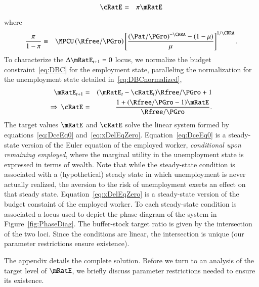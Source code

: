 \documentclass[titlepage,abstract]{\econtex}\newcommand{\texname}{ctDiscrete}
\begin{document}
\begin{eqnarray}
  \cRatE_{\tSS} & = & \pi \mRatE_{\tSS} 
\label{eq:DceEq0}
\end{eqnarray}
where
\begin{eqnarray}
  \frac{\pi}{1-\pi} & \equiv & \MPCU \left(\Rfree/\PGro\right) \left[\frac{(\Pat/\PGro)^{-\CRRA}-(1-\urate)}{\urate}\right]^{1/\CRRA}. \label{eq:DcSlope}
\end{eqnarray}
To characterize the $\Delta \mRatE_{t+1}=0$ locus, we normalize the budget constraint~\eqref{eq:DBC} for the employment state, paralleling the normalization for the unemployment state detailed in~\eqref{eq:DBCnormalized},
\begin{eqnarray}
  \mRatE_{t+1}  
  & = & 
  (\mRatE_{t}-\cRatE_{t}) \Rfree/\PGro + 1
\nonumber 
\\
\Rightarrow \
  \cRatE_{\tSS}  
  & = & 
  \frac{ 1 + (\Rfree/\PGro-1) \mRatE_{\tSS} }{\Rfree/\PGro}
\label{eq:xDelEqZero}
.
\end{eqnarray}
The target values $\mRatE$ and $\cRatE$ solve the linear system formed by equations~\eqref{eq:DceEq0} and~\eqref{eq:xDelEqZero}. 
Equation~\eqref{eq:DceEq0} is a steady-state version of the Euler equation of the employed worker, \textit{conditional upon remaining employed}, where the marginal utility in the unemployment state is expressed in terms of wealth. Note that while the steady-state condition is associated with a (hypothetical) steady state in which unemployment is never actually realized, the aversion to the risk of unemployment exerts an effect on that steady state. Equation~\eqref{eq:xDelEqZero} is a steady-state version of the budget constaint of the employed worker. To each steady-state condition is associated a locus used to depict the phase diagram of the system in Figure~\ref{fig:PhaseDiag}. The buffer-stock target ratio is given by the intersection of the two loci. Since the conditions are linear, the intersection is unique (our parameter restrictions ensure existence).

The appendix details the complete solution. Before we turn to an analysis of the target level of $\mRatE$, we briefly discuss parameter restrictions needed to ensure its existence.
\end{document}
